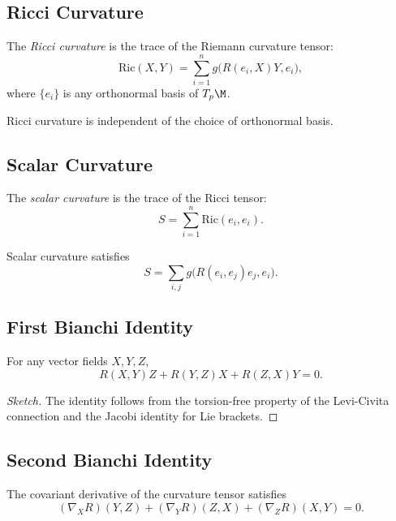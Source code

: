 \subsection{Ricci Curvature}

\begin{definition}
The \emph{Ricci curvature} is the trace of the Riemann curvature tensor:
\[
\mathrm{Ric}(X,Y)
= \sum_{i=1}^n g\big(R(e_i,X)Y, e_i\big),
\]
where $\{e_i\}$ is any orthonormal basis of $T_p\M$.
\end{definition}

\begin{lemma}
Ricci curvature is independent of the choice of orthonormal basis.
\end{lemma}

\subsection{Scalar Curvature}

\begin{definition}
The \emph{scalar curvature} is the trace of the Ricci tensor:
\[
S = \sum_{i=1}^n \mathrm{Ric}(e_i,e_i).
\]
\end{definition}

\begin{lemma}
Scalar curvature satisfies
\[
S = \sum_{i,j} g\big(R(e_i,e_j)e_j, e_i\big).
\]
\end{lemma}

\subsection{First Bianchi Identity}

\begin{theorem}
For any vector fields $X,Y,Z$,
\[
R(X,Y)Z + R(Y,Z)X + R(Z,X)Y = 0.
\]
\end{theorem}

\begin{proof}[Sketch]
The identity follows from the torsion-free property of the Levi-Civita
connection and the Jacobi identity for Lie brackets.
\end{proof}

\subsection{Second Bianchi Identity}

\begin{theorem}
The covariant derivative of the curvature tensor satisfies
\[
(\nabla_X R)(Y,Z) + (\nabla_Y R)(Z,X) + (\nabla_Z R)(X,Y) = 0.
\]
\end{theorem}

